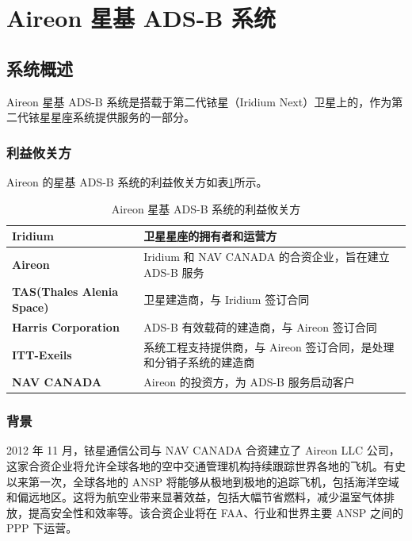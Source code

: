 


\section{Aireon 星基 ADS-B 系统}

\subsection{系统概述}

Aireon 星基 ADS-B 系统是搭载于第二代铱星（Iridium Next）卫星上的，作为第二代铱星星座系统提供服务的一部分。

\subsubsection{利益攸关方}

Aireon 的星基 ADS-B 系统的利益攸关方如表\ref{tab:stakeholders_of_Aireon_ads-b}所示。

\renewcommand\arraystretch{1.5}
\begin{table}[!htb]
\centering
\caption{Aireon 星基 ADS-B 系统的利益攸关方}
\label{tab:stakeholders_of_Aireon_ads-b}
\begin{tabular}[b]{|p{6cm}<{\raggedleft}|p{8cm}<{\raggedright}|}
\hline
\textbf{Iridium} & 卫星星座的拥有者和运营方 \\
\hline
\textbf{Aireon} & Iridium 和 NAV CANADA 的合资企业，旨在建立 ADS-B 服务 \\
\hline
\textbf{TAS(Thales Alenia Space)}& 卫星建造商，与 Iridium 签订合同 \\
\hline
\textbf{Harris Corporation} & ADS-B 有效载荷的建造商，与 Aireon 签订合同 \\
\hline
\textbf{ITT-Exeils} & 系统工程支持提供商，与 Aireon 签订合同，是处理和分销子系统的建造商 \\
\hline
\textbf{NAV CANADA} & Aireon 的投资方，为 ADS-B 服务启动客户 \\
\hline
\end{tabular}
\end{table}

\subsubsection{背景}

2012 年 11 月，铱星通信公司与 NAV CANADA 合资建立了 Aireon LLC 公司，这家合资企业将允许全球各地的空中交通管理机构持续跟踪世界各地的飞机。有史以来第一次，全球各地的 ANSP 将能够从极地到极地的追踪飞机，包括海洋空域和偏远地区。这将为航空业带来显著效益，包括大幅节省燃料，减少温室气体排放，提高安全性和效率等。该合资企业将在 FAA、行业和世界主要 ANSP 之间的 \acs{PPP} 下运营。

